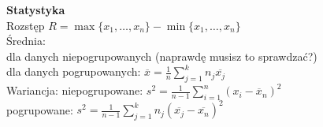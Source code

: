 \documentclass[10pt,landscape,a4paper,notitlepage]{article}
\begin{document}
\begin{multicols*}{4}
        \noindent\textbf{\large Statystyka}\\
        Rozstęp $R=\max\{x_1,\ldots,x_n\}-\min\{x_1,\ldots,x_n\}$\\
        Średnia:\\
        dla danych niepogrupowanych (naprawdę musisz to sprawdzać?)\\
        dla danych pogrupowanych: $\overline{x}=\frac{1}{n}\sum_{j=1}^kn_j\overline{x_j}$\\
        Wariancja: niepogrupowane: $s^2=\frac{1}{n-1}\sum_{i=1}^n(x_i-\overline{x}_n)^2$\\
        pogrupowane: $s^2=\frac{1}{n-1}\sum_{j=1}^kn_j(\overline{x_j}-\overline{x_n})^2$\\
    \end{multicols*}
\end{document}

